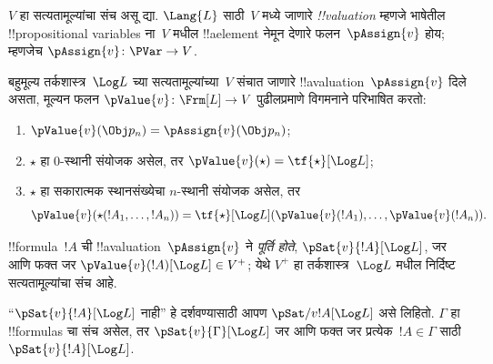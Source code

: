 \documentclass[../../../include/open-logic-section]{subfiles}
\begin{document}


\begin{defn}[!!^{valuation}s]
$V$ हा सत्यतामूल्यांचा संच असू द्या. $\Lang{L}$ साठी~$V$
मध्ये जाणारे \emph{!!{valuation}} म्हणजे भाषेतील
!!{propositional variable}s ना~$V$ मधील !!a{element} नेमून
देणारे फलन~$\pAssign{v}$ होय; म्हणजेच
$\pAssign{v} \colon \PVar \to V$.
\end{defn}

\begin{defn}
  बहुमूल्य तर्कशास्त्र~$\Log L$ च्या सत्यतामूल्यांच्या~$V$
  संचात जाणारे !!a{valuation}~$\pAssign{v}$ दिले असता,
  मूल्यन फलन $\pValue{v} \colon \Frm[L] \to V$
  पुढीलप्रमाणे विगमनाने परिभाषित करतो:
  \begin{enumerate}
    \item $\pValue{v}(\Obj p_n) = \pAssign{v}(\Obj p_n)$;
    \item $\star$ हा $0$-स्थानी संयोजक असेल, तर
    $\pValue{v}(\star)  = \tf{\star}[\Log L]$;
    \item $\star$ हा सकारात्मक स्थानसंख्येचा
    $n$-स्थानी संयोजक असेल, तर
    \[
      \pValue{v}(\star(!A_1, \dots, !A_n)) = \tf{\star}[\Log L]
      (\pValue{v}(!A_1), \dots, \pValue{v}(!A_n)).
    \]
  \end{enumerate}
\end{defn}

\begin{defn}[पूर्ति]
 !!{formula}~$!A$ ची
  !!a{valuation}~$\pAssign{v}$ ने \emph{पूर्ति होते},
  $\pSat{v}{!A}[\Log L]$, जर आणि फक्त जर
  $\pValue{v}(!A)[\Log L] \in V^+$; येथे $V^+$ हा
  तर्कशास्त्र~$\Log L$ मधील निर्दिष्ट सत्यतामूल्यांचा संच आहे.

  ``$\pSat{v}{!A}[\Log L]$ नाही'' हे दर्शवण्यासाठी आपण
  $\pSat/{v}{!A}[\Log L]$ असे लिहितो. $\Gamma$ हा
  !!{formula}s चा संच असेल, तर $\pSat{v}{\Gamma}[\Log L]$
  जर आणि फक्त जर प्रत्येक~$!A \in \Gamma$ साठी
  $\pSat{v}{!A}[\Log L]$.
\end{defn}
\end{document}
